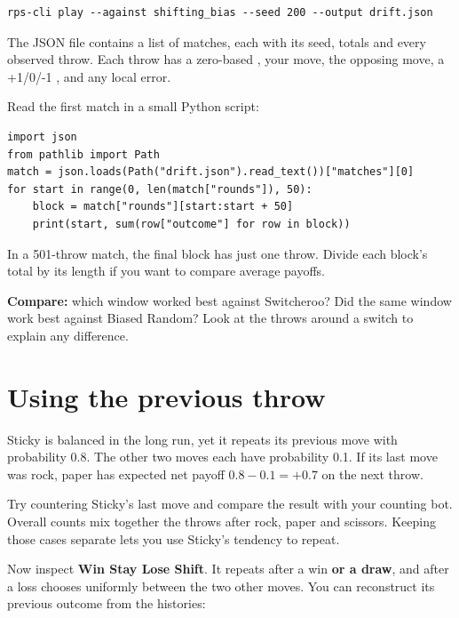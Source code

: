 \documentclass[11pt]{article}
\begin{document}
\begin{lstlisting}[style=shell,numbers=none,xleftmargin=4pt,framexleftmargin=0pt]
rps-cli play --against shifting_bias --seed 200 --output drift.json
\end{lstlisting}

The JSON file contains a list of matches, each with its seed, totals and every observed throw. Each throw has a zero-based , your move, the opposing move, a +1/0/-1 , and any local error.


Read the first match in a small Python script:


\begin{lstlisting}[style=python]
import json
from pathlib import Path
match = json.loads(Path("drift.json").read_text())["matches"][0]
for start in range(0, len(match["rounds"]), 50):
    block = match["rounds"][start:start + 50]
    print(start, sum(row["outcome"] for row in block))
\end{lstlisting}

In a 501-throw match, the final block has just one throw. Divide each block's total by its length if you want to compare average payoffs.


\begin{checkpoint}
\textbf{Compare:} which window worked best against Switcheroo? Did the same window work best against Biased Random? Look at the throws around a switch to explain any difference.
\end{checkpoint}
\clearpage
\section*{Using the previous throw}

\begin{context}
Sticky is balanced in the long run, yet it repeats its previous move with probability 0.8. The other two moves each have probability 0.1. If its last move was rock, paper has expected net payoff $0.8-0.1=+0.7$ on the next throw.

\end{context}


Try countering Sticky's last move and compare the result with your counting bot. Overall counts mix together the throws after rock, paper and scissors. Keeping those cases separate lets you use Sticky's tendency to repeat.


Now inspect \textbf{Win Stay Lose Shift}. It repeats after a win \textbf{or a draw}, and after a loss chooses uniformly between the two other moves. You can reconstruct its previous outcome from the histories:
\end{document}

